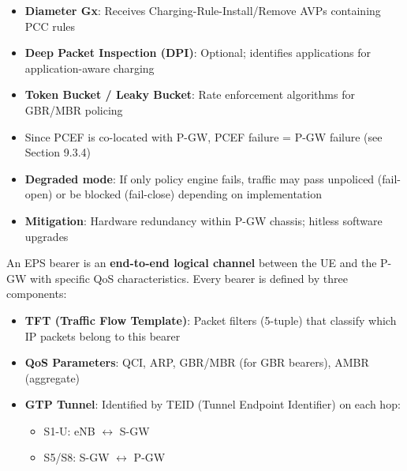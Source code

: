 
\begin{itemize}
\tightlist
\item
  \textbf{Diameter Gx}: Receives Charging-Rule-Install/\allowbreak{}Remove AVPs containing PCC rules
\item
  \textbf{Deep Packet Inspection (DPI)}: Optional; identifies applications for application-aware charging
\item
  \textbf{Token Bucket /\allowbreak{} Leaky Bucket}: Rate enforcement algorithms for GBR/\allowbreak{}MBR policing
\end{itemize}


\begin{itemize}
\tightlist
\item
  Since PCEF is co-located with P-GW, PCEF failure = P-GW failure (see Section 9.3.4)
\item
  \textbf{Degraded mode}: If only policy engine fails, traffic may pass unpoliced (fail-open) or be blocked (fail-close) depending on implementation
\item
  \textbf{Mitigation}: Hardware redundancy within P-GW chassis; hitless software upgrades
\end{itemize}



\CNchained{}

An EPS bearer is an \textbf{end-to-end logical channel} between the UE and the P-GW with specific QoS characteristics. Every bearer is defined by three components:


\begin{itemize}
\tightlist
\item
  \textbf{TFT (Traffic Flow Template)}: Packet filters (5-tuple) that classify which IP packets belong to this bearer
\item
  \textbf{QoS Parameters}: QCI, ARP, GBR/\allowbreak{}MBR (for GBR bearers), AMBR (aggregate)
\item
  \textbf{GTP Tunnel}: Identified by TEID (Tunnel Endpoint Identifier) on each hop:

  \begin{itemize}
  \tightlist
  \item
    S1-U: eNB \ensuremath{\leftrightarrow} S-GW
  \item
    S5/\allowbreak{}S8: S-GW \ensuremath{\leftrightarrow} P-GW
  \end{itemize}
\end{itemize}


